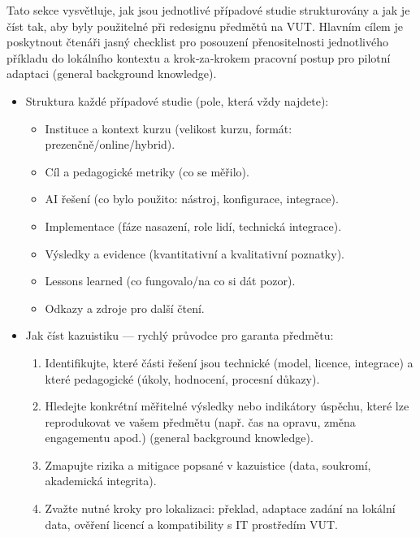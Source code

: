
Tato sekce vysvětluje, jak jsou jednotlivé případové studie strukturovány a jak je číst tak, aby byly použitelné při redesignu předmětů na VUT. Hlavním cílem je poskytnout čtenáři jasný checklist pro posouzení přenositelnosti jednotlivého příkladu do lokálního kontextu a krok‑za‑krokem pracovní postup pro pilotní adaptaci (general background knowledge).

\begin{itemize}
  \item Struktura každé případové studie (pole, která vždy najdete):
    \begin{itemize}
      \item Instituce a kontext kurzu (velikost kurzu, formát: prezenčně/online/hybrid).
      \item Cíl a pedagogické metriky (co se měřilo).
      \item AI řešení (co bylo použito: nástroj, konfigurace, integrace).
      \item Implementace (fáze nasazení, role lidí, technická integrace).
      \item Výsledky a evidence (kvantitativní a kvalitativní poznatky).
      \item Lessons learned (co fungovalo/na co si dát pozor).
      \item Odkazy a zdroje pro další čtení.
    \end{itemize}
  \item Jak číst kazuistiku — rychlý průvodce pro garanta předmětu:
    \begin{enumerate}
      \item Identifikujte, které části řešení jsou technické (model, licence, integrace) a které pedagogické (úkoly, hodnocení, procesní důkazy).
      \item Hledejte konkrétní měřitelné výsledky nebo indikátory úspěchu, které lze reprodukovat ve vašem předmětu (např. čas na opravu, změna engagementu apod.) (general background knowledge).
      \item Zmapujte rizika a mitigace popsané v kazuistice (data, soukromí, akademická integrita).
      \item Zvažte nutné kroky pro lokalizaci: překlad, adaptace zadání na lokální data, ověření licencí a kompatibility s IT prostředím VUT.
    \end{enumerate}
\end{itemize}

